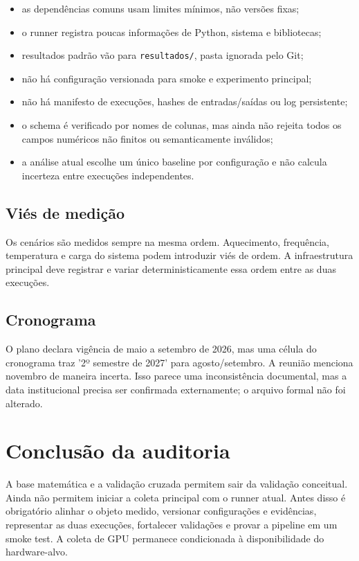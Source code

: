 \begin{itemize}
\item as dependências comuns usam limites mínimos, não versões fixas;
\item o runner registra poucas informações de Python, sistema e bibliotecas;
\item resultados padrão vão para \texttt{resultados/\allowbreak{}}, pasta ignorada pelo Git;
\item não há configuração versionada para smoke e experimento principal;
\item não há manifesto de execuções, hashes de entradas/saídas ou log persistente;
\item o schema é verificado por nomes de colunas, mas ainda não rejeita todos os
campos numéricos não finitos ou semanticamente inválidos;
\item a análise atual escolhe um único baseline por configuração e não calcula
incerteza entre execuções independentes.
\end{itemize}


\subsection{Viés de medição}






Os cenários são medidos sempre na mesma ordem. Aquecimento, frequência, temperatura e carga do sistema podem introduzir viés de ordem. A infraestrutura principal deve registrar e variar deterministicamente essa ordem entre as duas execuções.



\subsection{Cronograma}







O plano declara vigência de maio a setembro de 2026, mas uma célula do cronograma traz '2º semestre de 2027' para agosto/setembro. A reunião menciona novembro de maneira incerta. Isso parece uma inconsistência documental, mas a data institucional precisa ser confirmada externamente; o arquivo formal não foi alterado.



\section{Conclusão da auditoria}








A base matemática e a validação cruzada permitem sair da validação conceitual. Ainda não permitem iniciar a coleta principal com o runner atual. Antes disso é obrigatório alinhar o objeto medido, versionar configurações e evidências, representar as duas execuções, fortalecer validações e provar a pipeline em um smoke test. A coleta de GPU permanece condicionada à disponibilidade do hardware-alvo.
